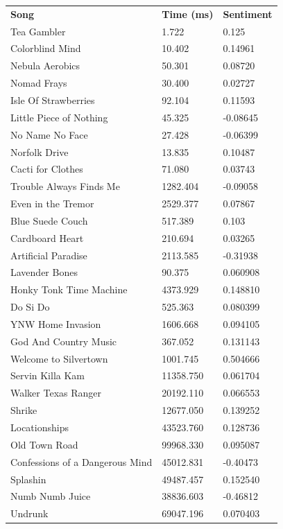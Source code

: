 \documentclass[12pt,conference]{IEEEtran}
\begin{document}
\begin{center}
\begin{small}
{\begin{tabular}{l|l|l}
\centering
\textbf{Song}                   & \textbf{Time (ms)}   & \textbf{Sentiment}    \\
Tea Gambler                     & 1.722 & 0.125        \\
Colorblind Mind                 & 10.402 & 0.14961  \\
Nebula Aerobics                 & 50.301 & 0.08720  \\
Nomad Frays                     & 30.400 & 0.02727  \\
Isle Of Strawberries            & 92.104 & 0.11593  \\
Little Piece of Nothing         & 45.325 & -0.08645 \\
No Name No Face                 & 27.428 & -0.06399 \\
Norfolk Drive                   & 13.835 & 0.10487  \\
Cacti for Clothes               & 71.080 & 0.03743  \\
Trouble Always Finds Me         & 1282.404 & -0.09058 \\
Even in the Tremor              & 2529.377 & 0.07867  \\
Blue Suede Couch                & 517.389  & 0.103    \\
Cardboard Heart                 & 210.694 & 0.03265  \\
Artificial Paradise             & 2113.585 & -0.31938 \\
Lavender Bones                  & 90.375 & 0.060908 \\
Honky Tonk Time Machine         & 4373.929 & 0.148810 \\
Do Si Do                        & 525.363 & 0.080399 \\
YNW Home Invasion               & 1606.668 & 0.094105 \\
God And Country Music           & 367.052 & 0.131143 \\
Welcome to Silvertown           & 1001.745 & 0.504666 \\
Servin Killa Kam                & 11358.750 & 0.061704 \\
Walker Texas Ranger             & 20192.110 & 0.066553 \\
Shrike                          & 12677.050 & 0.139252 \\
Locationships                   & 43523.760 & 0.128736 \\
Old Town Road                   & 99968.330 & 0.095087 \\
Confessions of a Dangerous Mind & 45012.831 & -0.40473 \\
Splashin                        & 49487.457 & 0.152540  \\
Numb Numb Juice                 & 38836.603 & -0.46812 \\
Undrunk                         & 69047.196 & 0.070403  
\end{tabular}}
\end{small}
\end{center}
\end{document}
